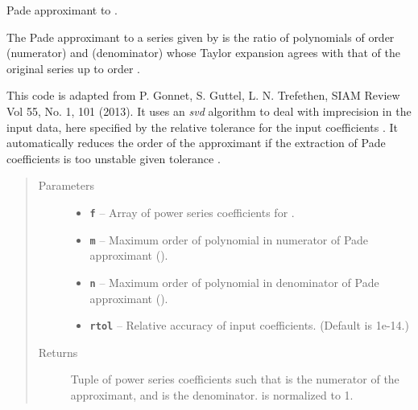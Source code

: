 \documentclass[letterpaper,10pt,english]{sphinxmanual}
\begin{document}
\begin{fulllineitems}
\label{g2tools:g2tools.pade_svd}
\code{{[}m,n{]}} Pade approximant to .

The \code{{[}m,n{]}} Pade approximant to a series given by
 is the ratio of  polynomials of order 
(numerator) and  (denominator) whose  Taylor expansion agrees
with that of the original series up to order .

This code is adapted from P. Gonnet,  S. Guttel, L. N. Trefethen, SIAM
Review Vol 55, No. 1, 101 (2013). It uses an \emph{svd} algorithm to deal with
imprecision in the input data,  here specified by the relative tolerance
 for the  input coefficients . It automatically reduces
the order of the approximant if the extraction of Pade coefficients
is too unstable given tolerance .
\begin{quote}\begin{description}
\item[{Parameters}] \leavevmode\begin{itemize}
\item {} 
\textbf{\texttt{f}} -- Array  of power series coefficients for .

\item {} 
\textbf{\texttt{m}} -- Maximum order of polynomial in numerator of Pade
approximant ().

\item {} 
\textbf{\texttt{n}} -- Maximum order of polynomial in denominator of Pade
approximant ().

\item {} 
\textbf{\texttt{rtol}} -- Relative accuracy of input coefficients. (Default is 1e-14.)

\end{itemize}

\item[{Returns}] \leavevmode
Tuple of power series coefficients  such that
 is the numerator of the approximant,
and  is the denominator.  is
normalized to 1.

\end{description}\end{quote}

\end{fulllineitems}
\end{document}
